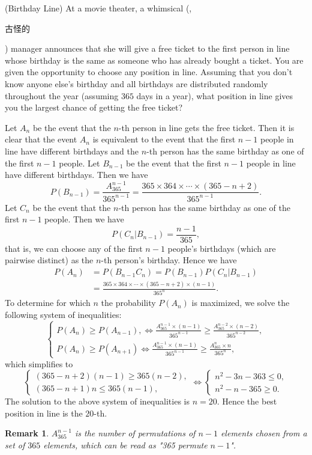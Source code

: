 \documentclass[12pt,letterpaper, onecolumn]{exam}
\newtheorem{remark}{Remark}
\begin{document}
\begin{questions}
    \question[](Birthday Line) At a movie theater, a whimsical (, \begin{CJK}{UTF8}{gbsn}古怪的\end{CJK}) manager announces that she will give a free ticket to the first person in line whose birthday is the same as someone who has already bought a ticket. You are given the opportunity to choose any position in line. Assuming that you don't know anyone else's birthday and all birthdays are distributed randomly throughout the year (assuming $365$ days in a year), what position in line gives you the largest chance of getting the free ticket?
\begin{solution}
    Let $A_n$ be the event that the $n$-th person in line gets the free ticket. Then it is clear that the event $A_n$ is equivalent to the event that the first $n-1$ people in line have different birthdays and the $n$-th person has the same birthday as one of the first $n-1$ people. Let $B_{n-1}$ be the event that the first $n-1$ people in line have different birthdays. Then we have 
    $$P(B_{n-1})=\frac{A_{365}^{n-1}}{365^{n-1}}=\frac{365\times 364\times\cdots\times (365-n+2)}{365^{n-1}}.$$
    Let $C_n$ be the event that the $n$-th person has the same birthday as one of the first $n-1$ people. Then we have 
    $$P(C_n|B_{n-1})=\frac{n-1}{365},$$
    that is, we can choose any of the first $n-1$ people's birthdays (which are pairwise distinct) as the $n$-th person's birthday. Hence we have
    \begin{align*}
        P(A_n)&=P(B_{n-1}C_n)=P(B_{n-1})P(C_n|B_{n-1})\\
        &=\frac{365\times 364\times\cdots\times (365-n+2)\times (n-1)}{365^n}.
    \end{align*}
    To determine for which $n$ the probability $P(A_n)$ is maximized, we solve the following system of inequalities:
    $$
    \begin{cases}
        P(A_n)\ge P(A_{n-1}),\Leftrightarrow\frac{A_{365}^{n-1}\times (n-1)}{365^{n-1}}\ge\frac{A_{365}^{n-2}\times (n-2)}{365^{n-2}},\\
        P(A_{n})\ge P(A_{n+1})\Leftrightarrow\frac{A_{365}^{n-1}\times (n-1)}{365^{n-1}}\ge\frac{A_{365}^{n}\times n}{365^n},
    \end{cases}
    $$
    which simplifies to 
    $$
    \begin{cases}
        (365-n+2)(n-1)\ge 365(n-2),\\
        (365-n+1)n\le 365(n-1),
    \end{cases}\Leftrightarrow\begin{cases}
        n^2-3n-363\le 0,\\
        n^2-n-365\ge 0.
    \end{cases}
    $$
    The solution to the above system of inequalities is $n=20$. Hence the best position in line is the $20$-th.
\end{solution}
\begin{remark}
    $A_{365}^{n-1}$ is the number of permutations of $n-1$ elements chosen from a set of $365$ elements, which can be read as "365 permute $n-1$".
\end{remark}



\end{questions}
\end{document}
